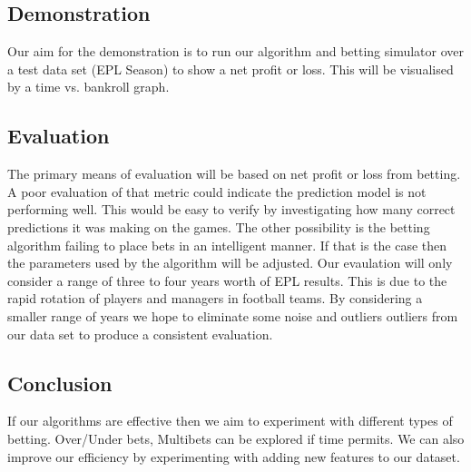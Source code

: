 \documentclass[10pt,twocolumn]{article}
\begin{document}
\subsection{Demonstration}
Our aim for the demonstration is to run our algorithm and betting simulator over a test data set (EPL Season) to show a net profit or loss. This will be visualised by a time vs. bankroll graph.  
\subsection{Evaluation}
The primary means of evaluation will be based on net profit or loss from betting. A poor evaluation of that metric could indicate the prediction model is not performing well. This would be easy to verify by investigating how many correct predictions it was making on the games. The other possibility is the betting algorithm failing to place bets in an intelligent manner. If that is the case then the parameters used by the algorithm will be adjusted. Our evaulation will only consider a range of three to four years worth of EPL results. This is due to the rapid rotation of players and managers in football teams. By considering a smaller range of years we hope to eliminate some noise and outliers outliers from our data set to produce a consistent evaluation.
\subsection{Conclusion}
If our algorithms are effective then we aim to experiment with different types of betting. Over/Under bets, Multibets can be explored if time permits. We can also improve our efficiency by experimenting with adding new features to our dataset.
\end{document}
